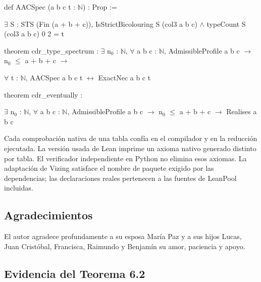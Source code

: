 \documentclass[spanish,11pt,a4paper]{article}
\begin{document}
\noindent\hspace*{0.0em}def AACSpec (a b c t : \(\mathbb N\)) : Prop :=\par
\noindent\hspace*{0.9em}\(\exists\) S : STS (Fin (a + b + c)), IsStrictBicolouring S (col3 a b c) \(\land\) typeCount S (col3 a b c) 0 2 = t\par
\noindent\hspace*{0.0em}\par
\noindent\hspace*{0.0em}theorem cdr\_\allowbreak{}type\_\allowbreak{}spectrum : \(\exists\) n\(_0\) : \(\mathbb N\), \(\forall\) a b c : \(\mathbb N\), AdmissibleProfile a b c \(\to\) n\(_0\) \(\le\) a + b + c \(\to\)\par
\noindent\hspace*{1.8em}\(\forall\) t : \(\mathbb N\), AACSpec a b c t \(\leftrightarrow\) ExactNec a b c t\par
\noindent\hspace*{0.0em}\par
\noindent\hspace*{0.0em}theorem cdr\_\allowbreak{}eventually :\par
\noindent\hspace*{1.8em}\(\exists\) n\(_0\) : \(\mathbb N\), \(\forall\) a b c : \(\mathbb N\), AdmissibleProfile a b c \(\to\) n\(_0\) \(\le\) a + b + c \(\to\) Realises a b c\par\endgroup

Cada comprobación nativa de una tabla confía en el compilador y en la reducción ejecutada. La versión usada de Lean imprime un axioma nativo generado distinto por tabla. El verificador independiente en Python no elimina esos axiomas. La adaptación de Vizing satisface el nombre de paquete exigido por las dependencias; las declaraciones reales pertenecen a las fuentes de LeanPool incluidas.

\subsection{Agradecimientos}\label{agradecimientos}

El autor agradece profundamente a su esposa María Paz y a sus hijos Lucas, Juan Cristóbal, Francisca, Raimundo y Benjamín su amor, paciencia y apoyo.

\subsection{Evidencia del Teorema 6.2}\label{evidencia-del-teorema-6.2}
\end{document}
